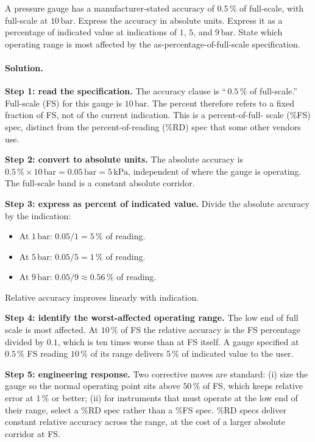 \begin{exercise}
A pressure gauge has a manufacturer-stated accuracy of $0.5\,\%$
of full-scale, with full-scale at $10\,\text{bar}$. Express the
accuracy in absolute units. Express it as a percentage of indicated
value at indications of $1$, $5$, and $9\,\text{bar}$. State which
operating range is most affected by the as-percentage-of-full-scale
specification.

\paragraph{Solution.}
\textbf{Step 1: read the specification.} The accuracy clause is
``\,$0.5\,\%$ of full-scale.'' Full-scale (FS) for this gauge is
$10 \,\text{bar}$. The percent therefore refers to a fixed fraction
of FS, not of the current indication. This is a percent-of-full-
scale (\%FS) spec, distinct from the percent-of-reading (\%RD) spec
that some other vendors use.

\textbf{Step 2: convert to absolute units.} The absolute accuracy
is $0.5\,\% \times 10 \,\text{bar} = 0.05 \,\text{bar} = 5 \,\text{
kPa}$, independent of where the gauge is operating. The full-scale
band is a constant absolute corridor.

\textbf{Step 3: express as percent of indicated value.} Divide the
absolute accuracy by the indication:
\begin{itemize}
  \item At $1 \,\text{bar}$: $0.05/1 = 5\,\%$ of reading.
  \item At $5 \,\text{bar}$: $0.05/5 = 1\,\%$ of reading.
  \item At $9 \,\text{bar}$: $0.05/9 \approx 0.56\,\%$ of reading.
\end{itemize}
Relative accuracy improves linearly with indication.

\textbf{Step 4: identify the worst-affected operating range.} The
low end of full scale is most affected. At $10\,\%$ of FS the
relative accuracy is the FS percentage divided by $0.1$, which is
ten times worse than at FS itself. A gauge specified at $0.5\,\%$
FS reading $10\,\%$ of its range delivers $5\,\%$ of indicated value
to the user.

\textbf{Step 5: engineering response.} Two corrective moves are
standard: (i) size the gauge so the normal operating point sits
above $50\,\%$ of FS, which keeps relative error at $1\,\%$ or
better; (ii) for instruments that must operate at the low end of
their range, select a \%RD spec rather than a \%FS spec. \%RD specs
deliver constant relative accuracy across the range, at the cost of
a larger absolute corridor at FS.


\end{exercise}
